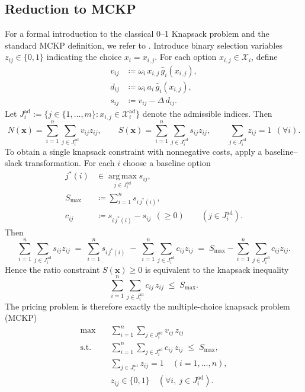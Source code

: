 \documentclass[11pt, a4paper]{article}
\theoremstyle{plain}
\theoremstyle{definition}
\theoremstyle{remark}
\begin{document}
\subsection{Reduction to MCKP}\label{par:MCKP}
For a formal introduction to the classical 0--1 Knapsack problem and the standard MCKP definition, we refer to .
Introduce binary selection variables $z_{ij}\in\{0,1\}$ indicating the choice $x_i=x_{i,j}$. For each option $x_{i,j}\in\mathcal X_i$, define
\begin{align}
    v_{ij} & \coloneqq \omega_i\,x_{i,j}\,\hat{g}_i(x_{i,j}), \\
    d_{ij} & \coloneqq \omega_i\,a_i\,\hat{g}_i(x_{i,j}), \\
    s_{ij} & \coloneqq v_{ij}-\Delta\,d_{ij}.
\end{align}
Let $J_i^{\mathrm{ad}}:=\{j\in\{1,\dots,m\}: x_{i,j}\in \mathcal X_i^{\mathrm{ad}}\}$ denote the admissible indices. Then
\[
N(\bm x)=\sum_{i=1}^n\sum_{j\in J_i^{\mathrm{ad}}} v_{ij}z_{ij},
\qquad
S(\bm x)=\sum_{i=1}^n\sum_{j\in J_i^{\mathrm{ad}}} s_{ij}z_{ij},
\qquad
\sum_{j\in J_i^{\mathrm{ad}}} z_{ij}=1 \ \ (\forall i).
\]
To obtain a single knapsack constraint with nonnegative costs, apply a baseline--slack transformation. For each $i$ choose a baseline option
\begin{align*}
    j^*(i) & \in \operatorname*{arg\,max}_{j\in J_i^{\mathrm{ad}}} s_{ij}, \\
    S_{\text{max}} & \coloneqq \sum_{i=1}^n s_{i\,j^*(i)}, \\
    c_{ij} & \coloneqq s_{i\,j^*(i)}-s_{ij}\ \ (\ge 0)\qquad (j\in J_i^{\mathrm{ad}}).
\end{align*}
Then
\[
\sum_{i=1}^n\sum_{j\in J_i^{\mathrm{ad}}} s_{ij}z_{ij}
\;=\;
\sum_{i=1}^n s_{i\,j^*(i)}
\;-\;
\sum_{i=1}^n\sum_{j\in J_i^{\mathrm{ad}}} c_{ij}z_{ij}
\;=\;
S_{\text{max}}-\sum_{i=1}^n\sum_{j\in J_i^{\mathrm{ad}}} c_{ij}z_{ij}.
\]
Hence the ratio constraint $S(\bm{x})\ge 0$ is equivalent to the knapsack inequality
\[
\sum_{i=1}^n\sum_{j\in J_i^{\mathrm{ad}}} c_{ij}\,z_{ij} \;\le\; S_{\text{max}}.
\]
The pricing problem is therefore exactly the multiple-choice knapsack problem (MCKP)
\begin{align}
    \max \quad & \sum_{i=1}^n \sum_{j\in J_i^{\mathrm{ad}}} v_{ij}\,z_{ij} \\
    \text{s.t.}\quad & \sum_{i=1}^n \sum_{j\in J_i^{\mathrm{ad}}} c_{ij}\,z_{ij} \;\le\; S_{\text{max}}, \\
    & \sum_{j\in J_i^{\mathrm{ad}}} z_{ij}=1 \quad (i=1,\dots,n), \\
    & z_{ij}\in\{0,1\}\quad (\forall i,\ j\in J_i^{\mathrm{ad}}).
\end{align}
\end{document}

